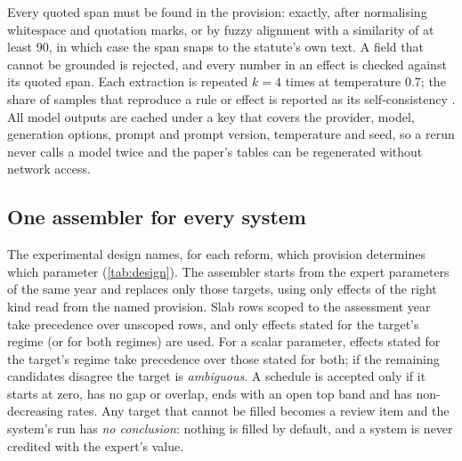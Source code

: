 \documentclass[sn-apa]{sn-jnl}
\begin{document}
Every quoted span must be found in the provision: exactly, after
normalising whitespace and quotation marks, or by fuzzy alignment with a
similarity of at least 90, in which case the span snaps to the statute's own
text. A field that cannot be grounded is rejected, and every number in an
effect is checked against its quoted span. Each extraction is repeated
$k=4$ times at temperature 0.7; the share of samples that reproduce a rule or
effect is reported as its self-consistency \citep{wang2023selfconsistency}.
All model outputs are cached under a key that covers the provider, model,
generation options, prompt and prompt version, temperature and seed, so a
rerun never calls a model twice and the paper's tables can be regenerated
without network access.

\subsection{One assembler for every system}
The experimental design names, for each reform, which provision determines
which parameter (\cref{tab:design}). The assembler starts from the expert
parameters of the same year and replaces only those targets, using only
effects of the right kind read from the named provision. Slab rows scoped to
the assessment year take precedence over unscoped rows, and only effects
stated for the target's regime (or for both regimes) are used. For a scalar
parameter, effects stated for the target's regime take precedence over those
stated for both; if the remaining candidates disagree the target is
\emph{ambiguous}. A schedule is accepted only if it starts at zero, has no
gap or overlap, ends with an open top band and has non-decreasing rates. Any
target that cannot be filled becomes a review item and the system's run has
\emph{no conclusion}: nothing is filled by default, and a system is never
credited with the expert's value.
\end{document}
